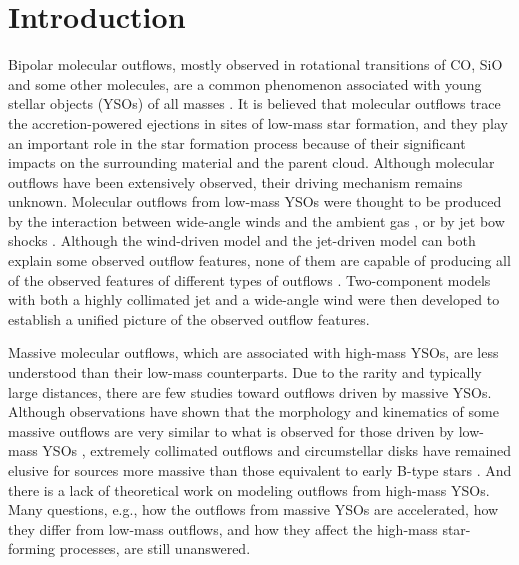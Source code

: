 \section{Introduction}
Bipolar molecular outflows, mostly observed in rotational transitions of CO, SiO and some other molecules, are a common phenomenon associated with young stellar objects (YSOs) of all masses \citep{2001ApJ...552L.167Z, 2002A&A...383..892B, 2004A&A...426..503W, 2005AJ....129..330W,  2015MNRAS.453..645M}. It is believed that molecular outflows trace the accretion-powered ejections in sites of low-mass star formation, and they play an important role in the star formation process because of their significant impacts on the surrounding material and the parent cloud. Although molecular outflows have been extensively observed, their driving mechanism remains unknown. Molecular outflows from low-mass YSOs were thought to be produced by the interaction between wide-angle winds and the ambient gas \citep{1991ApJ...370L..31S, 2001ApJ...557..429L}, or by jet bow shocks \citep{1993A&A...278..267R, 1993ApJ...414..230M, 2001ApJ...557..429L}. Although the wind-driven model and the jet-driven model can both explain some observed outflow features, none of them are capable of producing all of the observed features of different types of outflows \citep{2000ApJ...542..925L, 2002ApJ...576..294L}. Two-component models with both a highly collimated jet and a wide-angle wind were then developed to establish a unified picture of the observed outflow features\citep{2000prpl.conf..789S, 2006ApJ...641..949B, 2006MNRAS.365.1131P, 2006ApJ...649..845S, 2007prpl.conf..277P, 2008ApJ...676.1088M}.

Massive molecular outflows, which are associated with high-mass YSOs, are less understood than their low-mass counterparts. Due to the rarity and typically large distances, there are few studies toward outflows driven by massive YSOs. Although observations have shown that the morphology and kinematics of some massive outflows are very similar to what is observed for those driven by low-mass YSOs \citep[][]{1998ApJ...507..861S, 2002A&A...387..931B, 2009ApJ...696...66Q, 2011MNRAS.415L..49R}, extremely collimated outflows and circumstellar disks have remained elusive for sources more massive than those equivalent to early B-type stars \citep{2007prpl.conf..245A}. And there is a lack of theoretical work on modeling outflows from high-mass YSOs. Many questions, e.g., how the outflows from massive YSOs are accelerated, how they differ from low-mass outflows, and how they affect the high-mass star-forming processes, are still unanswered. 

